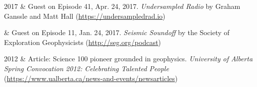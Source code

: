 \documentclass[a4paper, 11pt]{article}
\begin{document}
\begin{entryright}
2017 & Guest on Episode 41, Apr. 24, 2017. \emph{Undersampled Radio} by Graham Ganssle and Matt Hall (\href{https://undersampledrad.io/home/2017/4/inverterizer}{https://undersampledrad.io})
\end{entryright}

\begin{entryright}
 & Guest on Episode 11, Jan. 24, 2017. \emph{Seismic Soundoff} by the Society of Exploration Geophysicists (\href{http://seg.org/podcast/Post/4610/Episode-11-Geophysical-Electromagnetics-2017-DISC}{http://seg.org/podcast})
\end{entryright}

\begin{entryright}
2012 & Article: Science 100 pioneer grounded in geophysics. \emph{University of Alberta Spring Convocation 2012: Celebrating Talented People} (\href{https://www.ualberta.ca/news-and-events/newsarticles/2012/06/science100pioneergroundedingeophysics}{https://www.ualberta.ca/news-and-events/newsarticles})
\end{entryright}
\end{document}
